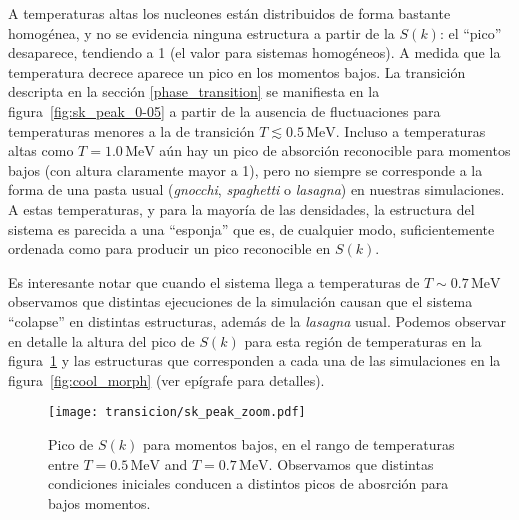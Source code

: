 A temperaturas altas los nucleones están distribuidos de forma bastante homogénea, y no se evidencia ninguna estructura a partir de la $S(k)$: el ``pico'' desaparece, tendiendo a 1 (el valor para sistemas homogéneos).
A medida que la temperatura decrece aparece un pico en los momentos bajos.
La transición descripta en la sección \ref{phase_transition} se manifiesta en la figura~\ref{fig:sk_peak_0-05} a partir de la ausencia de fluctuaciones para temperaturas menores a la de transición $T \lesssim 0.5\,\text{MeV}$.
Incluso a temperaturas altas como
$T=1.0\,\text{MeV}$ aún hay un pico de absorción reconocible para momentos bajos (con altura claramente mayor a 1), pero no siempre se corresponde a la forma de una pasta usual (\emph{gnocchi}, \emph{spaghetti} o
\emph{lasagna}) en nuestras simulaciones.
A estas temperaturas, y para la mayoría de las densidades, la estructura del sistema es parecida a una ``esponja'' que es, de cualquier modo, suficientemente ordenada como para producir un pico reconocible en $S(k)$.

Es interesante notar que cuando el sistema llega a temperaturas de $T\sim 0.7\,\text{MeV}$ observamos que distintas ejecuciones de la simulación causan que el sistema ``colapse'' en distintas estructuras, además de la \emph{lasagna} usual.
Podemos observar en detalle la altura del pico de  $S(k)$ para esta región de temperaturas en la figura~\ref{fig:sk_peak_zoom} y las estructuras que corresponden a cada una de las simulaciones en la figura~\ref{fig:cool_morph} (ver epígrafe para detalles).

\begin{figure}
  \texttt{[image: transicion/sk\_peak\_zoom.pdf]}
  \caption{Pico de $S(k)$ para momentos bajos, en el rango de temperaturas entre $T=0.5\,\text{MeV}$ and $T=0.7\,\text{MeV}$.
    Observamos que distintas condiciones iniciales conducen a distintos picos de abosrción para bajos momentos.}
  \label{fig:sk_peak_zoom}
\end{figure}


